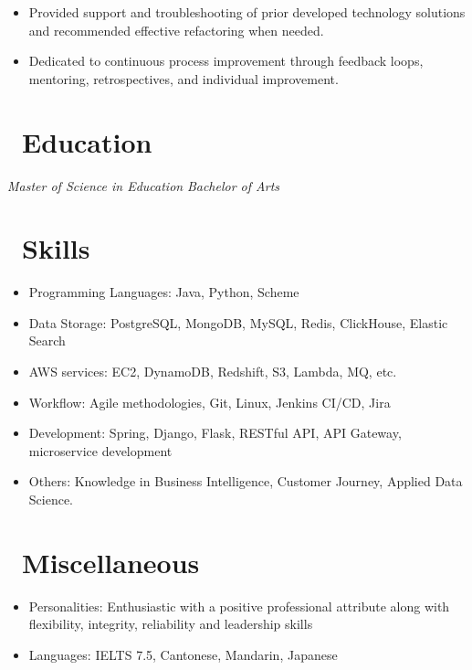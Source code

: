 \documentclass{resume}
\begin{document}
\begin{itemize}
  \item Provided support and troubleshooting of prior developed technology solutions and recommended effective refactoring when needed. 
  \item Dedicated to continuous process improvement through feedback loops, mentoring, retrospectives, and individual improvement.
\end{itemize}


\section{\faGraduationCap\ Education}
\textit{Master of Science in Education}
\textit{Bachelor of Arts}

\section{\faCogs\ Skills}
\begin{itemize}[parsep=0.5ex]
  \item Programming Languages: Java, Python, Scheme
  \item Data Storage: PostgreSQL, MongoDB, MySQL, Redis, ClickHouse, Elastic Search
  \item AWS services: EC2, DynamoDB, Redshift, S3, Lambda, MQ, etc.
  \item Workflow: Agile methodologies, Git, Linux, Jenkins CI/CD, Jira
  \item Development: Spring, Django, Flask, RESTful API, API Gateway, microservice development
  \item Others: Knowledge in Business Intelligence, Customer Journey, Applied Data Science.
\end{itemize}

\section{\faInfo\ Miscellaneous}
\begin{itemize}[parsep=0.5ex]
  \item Personalities: Enthusiastic with a positive professional attribute along with flexibility, integrity, reliability and leadership skills
  \item Languages: IELTS 7.5, Cantonese, Mandarin, Japanese
\end{itemize}

%
%
\end{document}
